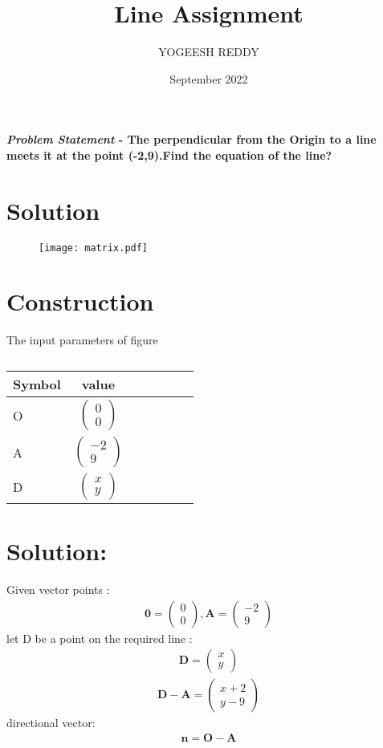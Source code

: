 \documentclass[journal,10pt,twocolumn]{article}
\title{\textbf{Line Assignment}}
\author{YOGEESH REDDY}
\date{September 2022}
\let\vec\mathbf
\newcommand{\myvec}[1]{\ensuremath{\begin{pmatrix}#1\end{pmatrix}}}
\begin{document}
\maketitle
\paragraph{\textit{\large Problem Statement} - The perpendicular from the Origin to a line meets it at the point (-2,9).Find the equation of the line?}
\section*{\large Solution}
\begin{figure}[H]
\centering
\texttt{[image: matrix.pdf]}
\caption{}
\end{figure}

\section*{\large Construction}



The input parameters of figure 



\begin{table}[htbp]
 \begin{center}
    \begin{tabular}{|l|c|c|c|c|c|c} \hline \textbf{Symbol}
  & \textbf{value} \\
 \hline
O & $\myvec{0\\0}$ \\ \hline
A & $\myvec{-2\\9}$  \\ \hline
D &  $\myvec{x\\y}$  \\ \hline

 
\end{tabular}   
\end{center}
\caption{\label{table:dummytable} }
\end{table}

\vspace*{10mm}


\section*{Solution:}

Given vector points :
\begin{eqnarray}
 \vec{0} = \myvec{0\\0},
 \vec{A} = \myvec{-2\\9}
\end{eqnarray}
let D be a point on the required line :
\begin{eqnarray}
 \vec{D} = \myvec{x\\y}
\end{eqnarray} 
 \begin{eqnarray*}
 \vec{D-A}=\myvec{x+2\\y-9}
   \end{eqnarray*}
directional vector:
\begin{eqnarray*}
 \vec{n}=\vec{O}- \vec{A}
\end{eqnarray*}
\end{document}
